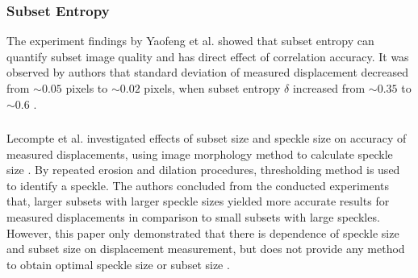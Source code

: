     \subsubsection{Subset Entropy}
        The experiment findings by Yaofeng et al. showed that subset entropy can quantify subset image quality and has direct effect of correlation accuracy. It was observed by authors that standard deviation of measured displacement decreased from $\sim 0.05$ pixels to $\sim 0.02$ pixels, when subset entropy $\delta$ increased from $\sim 0.35$ to $\sim 0.6$ \cite{yaofeng}.

    \subsubsection{}
        Lecompte et al. investigated effects of subset size and speckle size on accuracy of measured displacements, using image morphology method to calculate speckle size \cite{lecompte}. By repeated erosion and dilation procedures, thresholding method is used to identify a speckle. The authors concluded from the conducted experiments that, larger subsets with larger speckle sizes yielded more accurate results for measured displacements in comparison to small subsets with large speckles. However, this paper only demonstrated that there is dependence of speckle size and subset size on displacement measurement, but does not provide any method to obtain optimal speckle size or subset size \cite{lecompte}.





